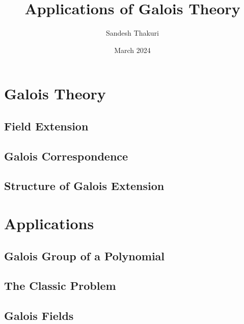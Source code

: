 \documentclass[a4paper,12pt,oneside,onecolumn,openany,final]{memoir}
\title{Applications of Galois Theory}
\author{Sandesh Thakuri}
\date{March 2024}
\begin{document}
\frontmatter








\tableofcontents  %

\mainmatter



\part{Galois Theory}
\chapter{Field Extension}


\chapter{Galois Correspondence}


\chapter{Structure of Galois Extension}




\part{Applications}
\chapter{Galois Group of a Polynomial}


\chapter{The Classic Problem}


\chapter{Galois Fields}


\backmatter


\end{document}
